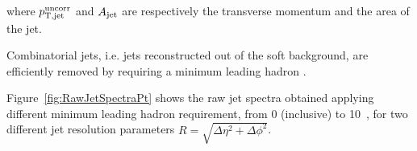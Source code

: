 \documentclass[a4paper]{jpconf}
\begin{document}
where $p_{\rm T,jet}^{\rm uncorr}$ and $A_{\rm jet}$ are respectively the transverse momentum and the area of the jet.

Combinatorial jets, i.e. jets reconstructed out of the soft background, are efficiently
removed by requiring a minimum leading hadron \pT{}. 

Figure~\ref{fig:RawJetSpectraPt} shows the \antikt{} raw jet \pT{} spectra obtained applying different minimum 
leading hadron \pT{} requirement, from 0 (inclusive) to 10~\gevc, for two different jet resolution 
parameters $R=\sqrt{\Delta\eta^2+\Delta\phi^2}$.
\end{document}

